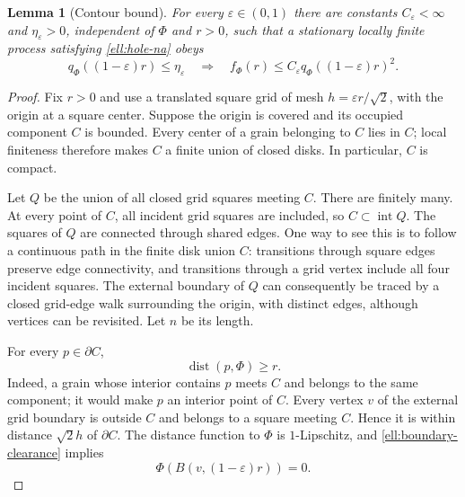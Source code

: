 \documentclass[11pt,a4paper]{article}
\newtheorem{lemma}[theorem]{Lemma}
\theoremstyle{definition}
\theoremstyle{remark}
\numberwithin{equation}{section}
\begin{document}
\begin{lemma}[Contour bound]\label{ell:contour}
For every $\varepsilon\in(0,1)$ there are constants
$C_\varepsilon<\infty$ and $\eta_\varepsilon>0$, independent of
$\Phi$ and $r>0$, such that a stationary locally finite process
satisfying \eqref{ell:hole-na} obeys
\begin{equation}\label{ell:contour-bound}
 q_\Phi((1-\varepsilon)r)\le\eta_\varepsilon
 \quad\Longrightarrow\quad
 f_\Phi(r)\le C_\varepsilon
                  q_\Phi((1-\varepsilon)r)^2.
\end{equation}
\end{lemma}

\begin{proof}
Fix $r>0$ and use a translated square grid of mesh
$h=\varepsilon r/\sqrt2$, with the origin at a square center.
Suppose the origin is covered and its occupied component $C$ is
bounded.  Every center of a grain belonging to $C$ lies in $C$;
local finiteness therefore makes $C$ a finite union of closed disks.
In particular, $C$ is compact.

Let $Q$ be the union of all closed grid squares meeting $C$.
There are finitely many.  At every point of $C$, all incident grid
squares are included, so $C\subset\operatorname{int}Q$.
The squares of $Q$ are connected through shared edges.  One way to
see this is to follow a continuous path in the finite disk union
$C$: transitions through square edges preserve edge connectivity,
and transitions through a grid vertex include all four incident
squares.  The external boundary of $Q$ can consequently be traced
by a closed grid-edge walk surrounding the origin, with distinct
edges, although vertices can be revisited.  Let $n$ be its length.

For every $p\in\partial C$,
\begin{equation}\label{ell:boundary-clearance}
 \operatorname{dist}(p,\Phi)\ge r.
\end{equation}
Indeed, a grain whose interior contains $p$ meets $C$ and belongs
to the same component; it would make $p$ an interior point of $C$.
Every vertex $v$ of the external grid boundary is outside $C$ and
belongs to a square meeting $C$.  Hence it is within distance
$\sqrt2h$ of $\partial C$.  The distance function to $\Phi$ is
$1$-Lipschitz, and \eqref{ell:boundary-clearance} implies
\begin{equation}\label{ell:vertex-void}
 \Phi(B(v,(1-\varepsilon)r))=0.
\end{equation}


\end{proof}
\end{document}
